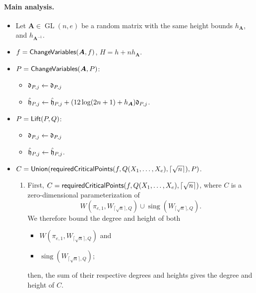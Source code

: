 \documentclass[12pt]{article}
\def\mA{{\bm A}}
\DeclareMathOperator{\GL}{GL}
\DeclareMathOperator{\sing}{sing}
\def\fd{\frak{d}}
\def\fh{\frak{h}}
\def\Lift{{\sf Lift}}
\def\requiredCriticalPointsL{{\sf requiredCriticalPoints}}
\def\ChangeVariables{{\sf ChangeVariables}}
\def\Union{{\sf Union}}
\def\CannyRoadmapL{{\sf CannyRoadmap}}
\def\mA{{\bm A}}
\begin{document}
\paragraph*{Main analysis.}
\begin{itemize}

    
    \item Let $\bm A \in \GL(n,e)$ be a random matrix with the same height bounds $h_{\mA}$, and $h_{\bm A^{-1}}$.
    
    \item $f= \ChangeVariables(\bm A, f)$, $H = h + nh_{\bm A}.$
    
     \item $P = \ChangeVariables(\bm A, P)$:
        \begin{itemize}
        \item $\fd_{P,j} \gets \fd_{P,j}$
        \item $\hat{\fh}_{P,j} \gets \hat{\fh}_{P,j}+(12\log(2n+1)+h_{\mA})\fd_{P,j}$.
        \end{itemize}

        \item $P = \Lift(P, Q)$: 
    \begin{itemize}
        \item $\fd_{P,j} \gets \fd_{P,j}$
        \item $\hat{\fh}_{P,j} \gets \hat{\fh}_{P,j}$. 
    \end{itemize}






    
    \item 
$C = \Union(\requiredCriticalPointsL(f,Q(X_1,\hdots,X_e),\lceil \sqrt{n} \rceil ),P)$. 
\newline


\begin{enumerate}
    \item First, $C = \requiredCriticalPointsL( f,Q(X_1,\hdots,X_e),\lceil \sqrt{n} \rceil )$, where $C$ is a zero-dimensional parameterization of \[W(\pi_{e,1},W_{\lceil \sqrt{n} \rceil ,Q}) 
\cup 
\sing(W_{\lceil \sqrt{n} \rceil ,Q}).
\]
We therefore bound the degree and height of both 
\begin{itemize}
    \item 
    $W(\pi_{e,1},W_{\lceil \sqrt{n} \rceil ,Q})$ and 
    \item $\sing(W_{\lceil \sqrt{n} \rceil ,Q})$;
\end{itemize}
then, the sum of their respective degrees and heights gives the 
degree and height of $C$.


\end{enumerate}
\end{itemize}
\end{document}
